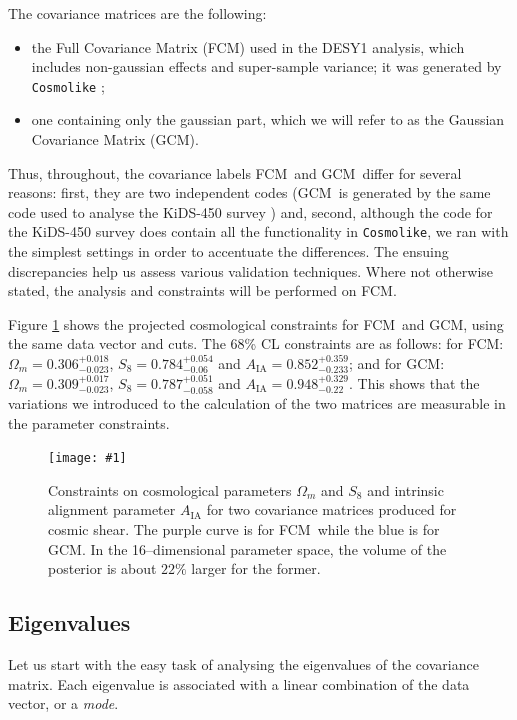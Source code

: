 \documentclass[twocolumn,nofootinbib]{\docclass}
\newcommand{\sfig}[2]{
	\texttt{[image: \#1]}
}
\newcommand{\Sfig}[2]{
	\begin{figure}[thbp]
		\sfig{../figures/#1.pdf}{\columnwidth}
		\caption{{\small #2}}
		\label{fig:#1}
	\end{figure}
}
\newcommand{\rf}[1]{Figure \ref{fig:#1}}
\newcommand\full{FCM}
\newcommand\gaussian{GCM}
\begin{document}
	The covariance matrices are the following:
	\begin{itemize}
		\item the Full Covariance Matrix (\full) used in the DESY1 analysis, which includes non-gaussian effects and super-sample variance; it was generated by {\tt Cosmolike} \citep{Krause:2016jvl};
		\item one containing only the gaussian part, which we will refer to as the Gaussian Covariance Matrix (\gaussian).
	\end{itemize}
	Thus, throughout, the covariance labels \full\ and \gaussian\ differ for several reasons: first, they are two independent codes (\gaussian\ is generated by the same code used to analyse the KiDS-450 survey \citep{Kohlinger:2017sxk, Joachimi:2020blm})
	and, second, although the code for the KiDS-450 survey does contain all the functionality in {\tt Cosmolike}, we ran with the simplest settings in order to accentuate the differences. The ensuing discrepancies help us assess various validation techniques. Where not otherwise stated, the analysis and constraints will be performed on \full.
	
	\rf{Y1-constraints_wmS8A} shows the projected cosmological constraints for \full\ and \gaussian, using the same data vector and cuts. The 68\% CL constraints are as follows: for \full: $\Omega_m = 0.306^{+ 0.018}_{- 0.023}$, $S_8 = 0.784^{+ 0.054}_{- 0.06}$ and $A_{\mathrm{IA}} = 0.852^{+ 0.359}_{- 0.233}$; and for \gaussian: $\Omega_m = 0.309^{+ 0.017}_{- 0.023}$, $S_8 = 0.787^{+ 0.051}_{- 0.058}$ and $A_{\mathrm{IA}} = 0.948^{+ 0.329}_{- 0.22}$. This shows that the variations we introduced to the calculation of the two matrices are measurable in the parameter constraints.
	
	\Sfig{Y1-constraints_wmS8A}{Constraints on cosmological parameters $\Omega_m$ and $S_8$ and intrinsic alignment parameter $A_{\mathrm{IA}}$ for two covariance matrices produced for cosmic shear. The purple curve is for \full\ while the blue is for \gaussian. In the 16--dimensional parameter space, the volume of the posterior is about $22\%$ larger for the former.}
	
	\subsection{Eigenvalues}
	\label{subsec:eigenvalues}
	
	Let us start with the easy task of analysing the eigenvalues of the covariance matrix. Each eigenvalue is associated with a linear combination of the data vector, or a \emph{mode}.
	
\end{document}
